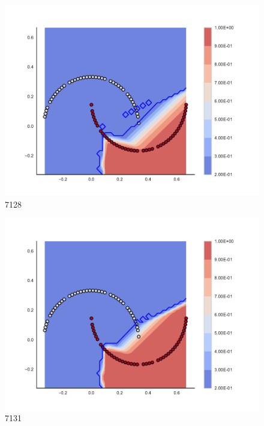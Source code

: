 \begin{subfigure}[b]{0.09\textwidth}
    \includegraphics[clip, trim=2.35cm 1.75cm 4.5cm 0cm,width=\textwidth]{img/convergence/7128.pdf}
    \caption{7128}
    \label{fig:convergence_7128}
\end{subfigure}
%
\begin{subfigure}[b]{0.09\textwidth}
    \includegraphics[clip, trim=2.35cm 1.75cm 4.5cm 0cm,width=\textwidth]{img/convergence/7131.pdf}
    \caption{7131}
    \label{fig:convergence_7131}
\end{subfigure}
%
